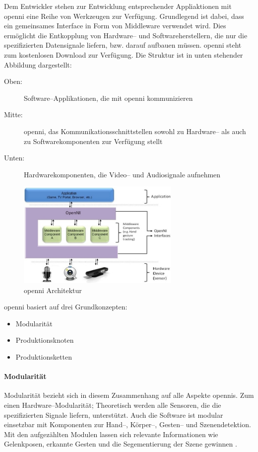 Dem Entwickler stehen zur Entwicklung entsprechender Appliaktionen mit \gls{openni} eine Reihe von Werkzeugen zur Verfügung.
Grundlegend ist dabei, dass ein gemeinsames Interface in Form von Middleware verwendet wird.
Dies ermöglicht die Entkopplung von Hardware-- und Softwareherstellern, die nur die spezifizierten Datensignale liefern, bzw. darauf aufbauen müssen.
\gls{openni} steht zum kostenlosen Download zur Verfügung.
Die Struktur ist in unten stehender Abbildung dargestellt: 

\begin{description}
 \item[Oben:] Software--Applikationen, die mit \gls{openni} kommunizieren
 \item[Mitte:] \gls{openni}, das Kommunikationsschnittstellen sowohl zu Hardware-- als auch zu Softwarekomponenten zur Verfügung stellt
 \item[Unten:] Hardwarekomponenten, die Video-- und Audiosignale aufnehmen
\end{description}

\begin{figure}[h]
	\center
	\includegraphics[width=0.7\textwidth]{graphics/openNI.jpg}
	\caption{\label{fig:openNI} \gls{openni} Architektur \cite{kinect_6}}
\end{figure}

\gls{openni} basiert auf drei Grundkonzepten:
\begin{itemize}
  \item Modularität
  \item Produktionsknoten
  \item Produktionsketten
\end{itemize}


\paragraph{Modularität}
Modularität bezieht sich in diesem Zusammenhang auf alle Aspekte \glspl{openni}.
Zum einen Hardware--Modularität;
Theoretisch werden alle Sensoren, die die spezifizierten Signale liefern, unterstützt.
Auch die Software ist modular einsetzbar mit Komponenten zur Hand--, Körper--, Gesten-- und Szenendetektion.
Mit den aufgezählten Modulen lassen sich relevante Informationen wie Gelenkposen, erkannte Gesten und die Segementierung der Szene gewinnen \cite{kinect_6}.

